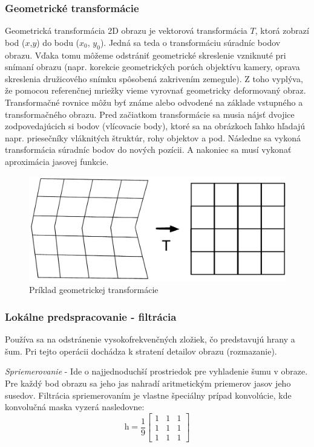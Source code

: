 \subsubsection{Geometrické transformácie}
Geometrická transformácia 2D obrazu je vektorová transformácia $T$, ktorá zobrazí bod ($x$,$y$) do bodu ($x_0$, $y_0$).  Jedná sa teda o transformáciu súradníc bodov obrazu. Vďaka tomu môžeme odstrániť geometrické skreslenie vzniknuté pri snímaní obrazu (napr. korekcie geometrických porúch objektívu kamery, oprava skreslenia družicového snímku spôsobená zakrivením zemegule).  Z toho vyplýva, že pomocou referenčnej mriežky vieme vyrovnať geometricky deformovaný obraz. Transformačné rovnice môžu byť známe alebo odvodené na základe vstupného a transformačného  obrazu. Pred začiatkom transformácie sa musia nájsť dvojice zodpovedajúcich si bodov (vlícovacie body), ktoré sa na obrázkoch ľahko hľadajú napr. priesečníky vláknitých štruktúr, rohy objektov a pod. Následne sa vykoná transformácia súradníc bodov do nových pozícii. A nakoniec sa musí vykonať aproximácia jasovej funkcie.

\begin{figure}[H]
\begin{center}
	\includegraphics[scale=0.4]{obrazky/geometrickaTransformacia}
	\caption{Príklad geometrickej transformácie}
	\end{center}
\end{figure}

\subsubsection{Lokálne predspracovanie - filtrácia}
Používa sa na odstránenie vysokofrekvenčných zložiek, čo predstavujú hrany a šum. Pri tejto operácii dochádza k stratení detailov obrazu (rozmazanie).

\textit{Spriemerovanie} - Ide o najjednoduchší prostriedok pre vyhladenie šumu v obraze. Pre každý bod obrazu sa jeho jas nahradí aritmetickým priemerov jasov jeho susedov. Filtrácia spriemerovaním je vlastne špeciálny prípad konvolúcie, kde konvolučná maska vyzerá nasledovne:
$$\textit{h}=\frac{1}{9}\begin{bmatrix} 1 & 1 & 1 \\ 1 & 1 & 1 \\ 1 & 1 & 1  \end{bmatrix}$$

